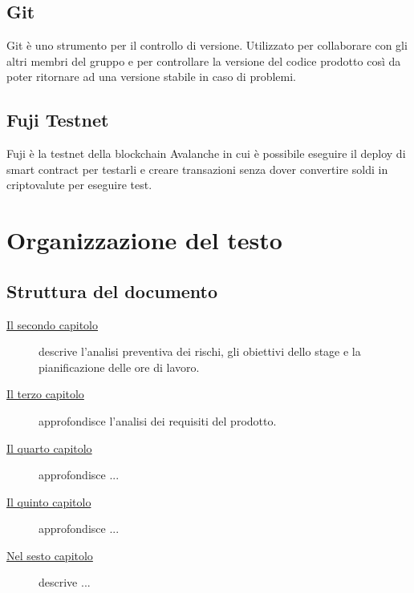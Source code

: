 \subsection*{Git}
Git è uno strumento per il controllo di versione. Utilizzato per collaborare con gli altri membri del gruppo e per controllare la versione del codice prodotto così da poter ritornare ad una versione stabile in caso di problemi.

\subsection*{Fuji Testnet}
Fuji è la testnet della blockchain Avalanche in cui è possibile eseguire il deploy di smart contract per testarli e creare transazioni senza dover convertire soldi in criptovalute per eseguire test.

\section{Organizzazione del testo}
\subsection{Struttura del documento}
\begin{description}

    \item[{\hyperref[cap:descrizione-stage]{Il secondo capitolo}}] descrive l’analisi preventiva dei rischi, gli obiettivi dello stage e la pianificazione delle ore di lavoro.
    
    \item[{\hyperref[cap:analisi-requisiti]{Il terzo capitolo}}] approfondisce l'analisi dei requisiti del prodotto.
    
    \item[{\hyperref[cap:progettazione-codifica]{Il quarto capitolo}}] approfondisce ...
    
    \item[{\hyperref[cap:verifica-validazione]{Il quinto capitolo}}] approfondisce ...
    
    \item[{\hyperref[cap:conclusioni]{Nel sesto capitolo}}] descrive ...
\end{description}

